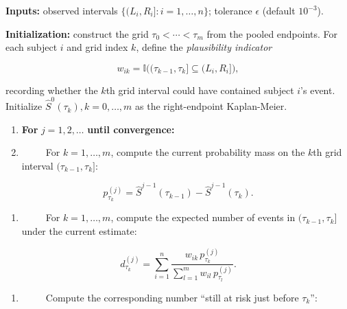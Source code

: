 \documentclass[
  letterpaper,
  krantz2]{style/krantz}
\providecommand{\tightlist}{%
  \setlength{\itemsep}{0pt}\setlength{\parskip}{0pt}}
\begin{document}
\begin{tcolorbox}[enhanced jigsaw, toprule=.15mm, bottomtitle=1mm, opacityback=0, breakable, leftrule=.75mm, title={Algorithm 1 (Turnbull NPMLE for interval-censored data)}, toptitle=1mm, bottomrule=.15mm, colback=white, colframe=quarto-callout-note-color-frame, titlerule=0mm, opacitybacktitle=0.6, coltitle=black, rightrule=.15mm, left=2mm, colbacktitle=quarto-callout-note-color!10!white, arc=.35mm]

\textbf{Inputs:} observed intervals \(\{(L_i, R_i] : i = 1,\ldots,n\}\);
tolerance \(\epsilon\) (default \(10^{-3}\)).

\textbf{Initialization:} construct the grid \(\tau_0 < \cdots < \tau_m\)
from the pooled endpoints. For each subject \(i\) and grid index \(k\),
define the \emph{plausibility indicator}

\[
w_{ik} = \mathbb{I}\bigl((\tau_{k-1}, \tau_k] \subseteq (L_i, R_i]\bigr),
\]

recording whether the \(k\)th grid interval could have contained subject
\(i\)'s event. Initialize \(\hat{S}^{0}(\tau_k), k = 0, \ldots, m\) as
the right-endpoint Kaplan-Meier.

\begin{enumerate}
\def\labelenumi{\arabic{enumi}.}
\tightlist
\item
  \textbf{For} \(j = 1, 2, \ldots\) \textbf{until convergence:}
\item
  ~~~~~For \(k = 1, \ldots, m\), compute the current probability mass on
  the \(k\)th grid interval \((\tau_{k-1}, \tau_k]\):
\end{enumerate}

\[
p_{\tau_k}^{(j)} = \hat{S}^{j-1}(\tau_{k-1}) - \hat{S}^{j-1}(\tau_k).
\]

\begin{enumerate}
\def\labelenumi{\arabic{enumi}.}
\setcounter{enumi}{2}
\tightlist
\item
  ~~~~~For \(k = 1, \ldots, m\), compute the expected number of events
  in \((\tau_{k-1}, \tau_k]\) under the current estimate:
\end{enumerate}

\[
d_{\tau_k}^{(j)} = \sum_{i=1}^{n} \frac{w_{ik}\, p_{\tau_k}^{(j)}}{\sum_{l=1}^{m} w_{il}\, p_{\tau_l}^{(j)}}.
\]

\begin{enumerate}
\def\labelenumi{\arabic{enumi}.}
\setcounter{enumi}{3}
\tightlist
\item
  ~~~~~Compute the corresponding number ``still at risk just before
  \(\tau_k\)'':
\end{enumerate}


\end{tcolorbox}
\end{document}
